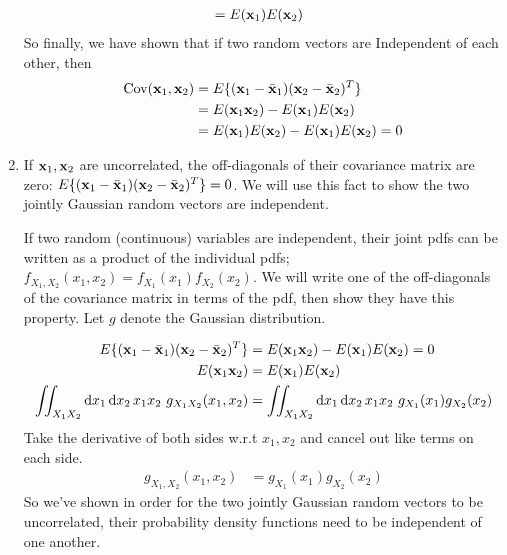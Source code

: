 \documentclass{article}
\begin{document}
\begin{solution}
\begin{enumerate}[label=(\alph*)]
\begin{align*}
                &= E(\vb{x}_1) E(\vb{x}_2)
            \end{align*}
        So finally, we have shown that if two random vectors are Independent of each other, then 
        \begin{equation}
            \begin{aligned}
                \operatorname{Cov}(\vb{x}_1, \vb{x}_2) &= E \{ (\vb{x}_1 - \bar{\vb{x}}_1) (\vb{x}_2 - \bar{\vb{x}}_2)^T \}\\ &= E(\vb{x}_1 \vb{x}_2) - E(\vb{x}_1)E(\vb{x}_2)  \\
                &= E(\vb{x}_1)E(\vb{x}_2) - E(\vb{x}_1)E(\vb{x}_2) = 0
            \end{aligned}
        \end{equation}

        \item If $\vb{x}_1, \vb{x}_2$ are uncorrelated, the off-diagonals of their covariance matrix are zero: $E \{ (\vb{x}_1 - \bar{\vb{x}}_1) (\vb{x}_2 - \bar{\vb{x}}_2)^T \} = 0$.
        We will use this fact to show the two jointly Gaussian random vectors are independent.

        If two random (continuous) variables are independent, their joint pdfs can be written as a product of the individual pdfs; $f_{X_1, X_2}(x_1, x_2) = f_{X_1}(x_1)f_{X_2}(x_2)$. We will write one of the off-diagonals of the covariance matrix in terms of the pdf, then show they have this property. Let $g$ denote the Gaussian distribution.

        \begin{align*}
            E \{ (\vb{x}_1 - \bar{\vb{x}}_1) (\vb{x}_2 - \bar{\vb{x}}_2)^T \}
            &= E(\vb{x}_1 \vb{x}_2) - E(\vb{x}_1)E(\vb{x}_2)  = 0 \\
            E(\vb{x}_1 \vb{x}_2) &= E(\vb{x}_1)E(\vb{x}_2) \\
            \iint_{X_1 X_2} \dd{x_1} \dd{x_2} x_1 x_2 \ g_{X_1 X_2}(x_1, x_2) &= 
            \iint_{X_1 X_2} \dd{x_1} \dd{x_2} x_1 x_2 \ g_{X_1}(x_1) g_{X_2}(x_2)
        \end{align*}
        Take the derivative of both sides w.r.t $x_1, x_2$ and cancel out like terms on each side.
        \begin{align}
            g_{X_1, X_2}(x_1, x_2) &=  g_{X_1}(x_1) g_{X_2}(x_2)
        \end{align}
        So we've shown in order for the two jointly Gaussian random vectors to be uncorrelated, their probability density functions need to be independent of one another.
        \end{enumerate}
    \end{solution}
\end{document}
